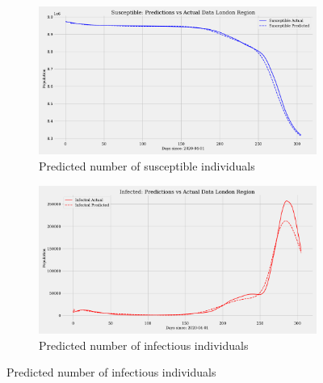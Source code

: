 \documentclass[12pt]{article}
\begin{document}
\begin{figure}[ht]
    \centering
    \begin{subfigure}[t]{0.45\textwidth}
        \includegraphics[width=\textwidth]{images/pinn/S_predictions_London Region.pdf}
        \caption{Predicted number of susceptible individuals}
        \label{fig:S_predictions_London}
    \end{subfigure}
    \hfill %
    \begin{subfigure}[t]{0.45\textwidth}
        \includegraphics[width=\textwidth]{images/pinn/I_predictions_London Region.pdf}
        \caption{Predicted number of infectious individuals}
        \label{fig:I_predictions_London}
    \end{subfigure}
    
    \vspace{0.5cm}
    

\end{figure}
\end{document}
